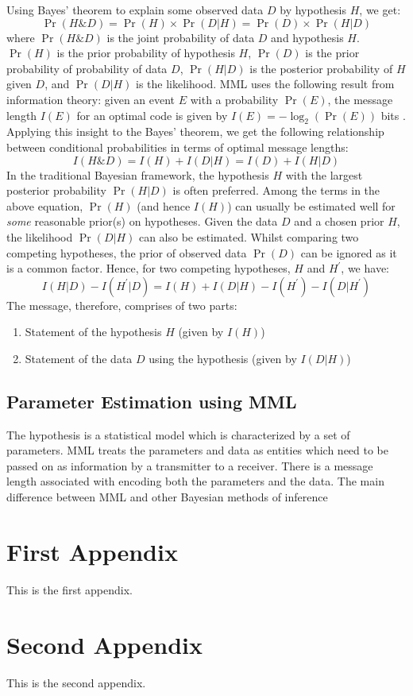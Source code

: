\documentclass[wcp]{jmlr}
\begin{document}
Using Bayes' theorem to explain some observed data $D$ by hypothesis $H$, we get:
\begin{equation*}
  \Pr(H\&D) = \Pr(H) \times \Pr(D|H) = \Pr(D) \times \Pr(H|D)
\end{equation*}
where $\Pr(H\&D)$ is the joint probability of data $D$ and hypothesis $H$. $\Pr(H)$
is the prior probability of hypothesis $H$, $\Pr(D)$ is the prior probability of 
probability of data $D$, $\Pr(H|D)$ is the posterior probability of $H$
given $D$, and $\Pr(D|H)$ is the likelihood.
MML uses the following result from information theory: given an event $E$
with a probability $\Pr(E)$, the message length $I(E)$ for an optimal
code is given by $I(E) = -\log_2 (\Pr(E))$ bits \citep{shannon1948}. Applying this insight
to the Bayes' theorem, we get the following relationship between
conditional probabilities in terms of optimal message lengths:
\begin{equation*}
  I(H\&D) = I(H) + I(D|H) = I(D) + I(H|D)
\end{equation*}
In the traditional Bayesian framework, the hypothesis $H$ with
the largest posterior probability $\Pr(H|D)$ is often preferred.
Among the terms in the above equation, $\Pr(H)$ (and hence $I(H)$) can
usually be estimated well for \emph{some} reasonable prior(s) on hypotheses.
Given the data $D$ and a chosen prior $H$, the likelihood $\Pr(D|H)$ can also be estimated.
Whilst comparing two competing hypotheses, the prior of observed data $\Pr(D)$
can be ignored as it is a common factor. Hence, for two competing hypotheses, $H$ and $H^\prime$, we have:
\begin{equation*}
I(H|D) - I(H^\prime|D) = I(H) + I(D|H) - I(H^\prime) - I(D|H^\prime)
\end{equation*}
The message, therefore, comprises of two parts: 
\begin{enumerate}
\item Statement of the hypothesis $H$ (given by $I(H)$)  
\item Statement of the data $D$ using the hypothesis (given by $I(D|H)$) 
\end{enumerate}

\subsection{Parameter Estimation using MML}
The hypothesis is a statistical model which is characterized by a set of parameters.
MML treats the parameters and data as entities which need to be passed on as 
information by a transmitter to a receiver. There is a message length associated
with encoding both the parameters and the data. The main difference between MML and
other Bayesian methods of inference 



\appendix

\section{First Appendix}\label{apd:first}

This is the first appendix.

\section{Second Appendix}\label{apd:second}

This is the second appendix.
\end{document}
